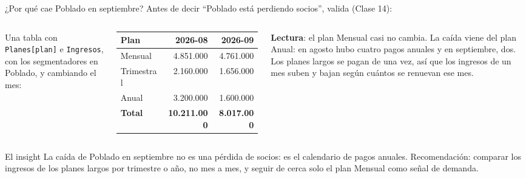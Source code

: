 \documentclass[aspectratio=169,11pt]{beamer}
\begin{document}
\begin{frame}[t]{¿Por qué cae Poblado en septiembre?}
  \small
  Antes de decir ``Poblado está perdiendo socios'', valida (Clase 14):
  \vspace{0.1cm}
  \begin{columns}[T,onlytextwidth]
    \footnotesize Una tabla con \texttt{Planes[plan]} e \texttt{Ingresos},
    con los segmentadores en Poblado, y cambiando el mes:

    \vspace{0.05cm}
    \scriptsize
    \begin{tabular}{@{}lrr@{}}
      \toprule
      \textbf{Plan} & \textbf{2026-08} & \textbf{2026-09} \\
      \midrule
      Mensual & 4.851.000 & 4.761.000 \\
      Trimestral & 2.160.000 & 1.656.000 \\
      Anual & 3.200.000 & 1.600.000 \\
      \midrule
      \textbf{Total} & \textbf{10.211.000} & \textbf{8.017.000} \\
      \bottomrule
    \end{tabular}
    \footnotesize\textbf{Lectura}: el plan Mensual casi no cambia. La caída
    viene del plan Anual: en agosto hubo cuatro pagos anuales y en
    septiembre, dos. Los planes largos se pagan de una vez, así que los
    ingresos de un mes suben y bajan según cuántos se renuevan ese mes.
  \end{columns}
  \vspace{0.15cm}
  \begin{exampleblock}{El insight}
    \footnotesize La caída de Poblado en septiembre no es una pérdida de
    socios: es el calendario de pagos anuales. Recomendación: comparar
    los ingresos de los planes largos por trimestre o año, no mes a mes, y
    seguir de cerca solo el plan Mensual como señal de demanda.
  \end{exampleblock}
\end{frame}
\end{document}
